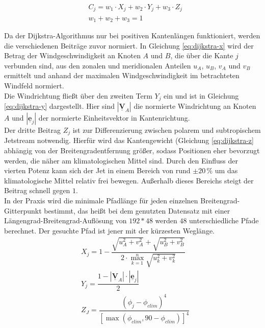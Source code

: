 \begin{align}
  & C_j = w_1 \cdot X_j + w_2 \cdot Y_j + w_3 \cdot Z_j   
  \label{eq:dijkstra1}\\
  & w_1 + w_2 + w_3 = 1
  \label{eq:dijkstra2}
\end{align} 

Da der Dijkstra-Algorithmus nur bei positiven Kantenlängen funktioniert, werden die verschiedenen Beiträge zuvor normiert. In Gleichung \ref{eq:dijkstra-x} wird der Betrag der Windgeschwindigkeit an Knoten $A$ und $B$, die über die Kante $j$ verbunden sind, aus den zonalen und meridionalen Anteilen $u_A$, $u_B$, $v_A$ und $v_B$ ermittelt und anhand der maximalen Windgeschwindigkeit im betrachteten Windfeld normiert.
\\
Die Windrichtung fließt über den zweiten Term $Y_j$ ein und ist in Gleichung \ref{eq:dijkstra-y} dargestellt. Hier sind $|\underline{\boldsymbol{V}}_A|$ die normierte Windrichtung an Knoten $A$ und $|\underline{\boldsymbol{e}}_j|$ der normierte Einheitsvektor in Kantenrichtung.
\\
Der dritte Beitrag $Z_j$ ist zur Differenzierung zwischen polarem und subtropischem Jetstream notwendig. Hierfür wird das Kantengewicht (Gleichung \ref{eq:dijkstra-z} abhängig von der Breitengradentfernung größer, sodass Positionen eher bevorzugt werden, die näher am klimatologischen Mittel sind. Durch den Einfluss der  vierten Potenz kann sich der Jet in einem Bereich von rund $\pm 20\,\%$ um das klimatologische Mittel relativ frei bewegen. Außerhalb dieses Bereichs steigt der Beitrag schnell gegen $1$.
\\
In der Praxis wird die minimale Pfadlänge für jeden einzelnen Breitengrad-Gitterpunkt bestimmt, das heißt bei dem genutzten Datensatz mit einer Längengrad-Breitengrad-Auflösung von $192 \ast 48$ werden $48$ unterschiedliche Pfade berechnet. Der gesuchte Pfad ist jener mit der kürzesten Weglänge.
\begin{align}
  & X_j = 1 - \dfrac{\sqrt{u_A^2 + v_A^2} + \sqrt{u_B^2 + v_B^2}}{2 \cdot \max_{k=1}^n  \sqrt{u_k^2 + v_k^2}}  
  \label{eq:dijkstra-x}\\
  & Y_j = \dfrac{1 - |\underline{\boldsymbol{V}}_A| \cdot |\underline{\boldsymbol{e}}_j|}{2} 
  \label{eq:dijkstra-y}\\
  & Z_J = \dfrac{\left( \phi_j - \phi_{clim} \right)^4}{\left[ \max \left( \phi_{clim}, 90 - \phi_{clim} \right) \right]^4}
  \label{eq:dijkstra-z}
\end{align}

